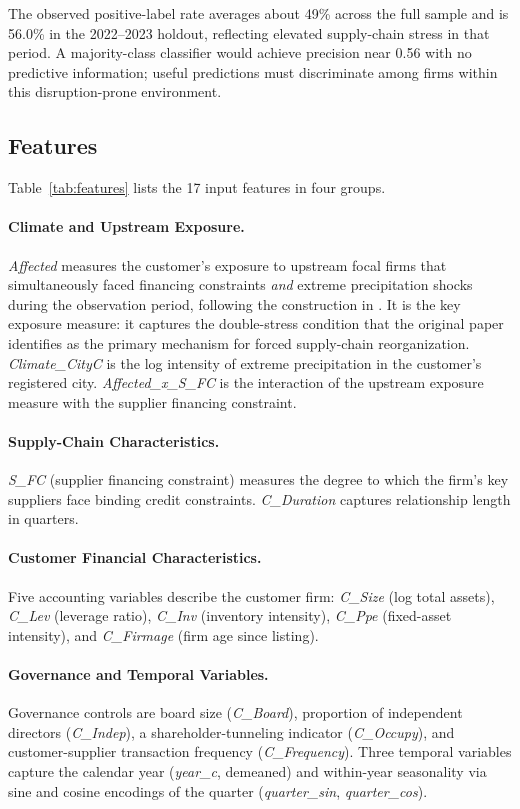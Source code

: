 \documentclass[12pt]{article}
\begin{document}
The observed positive-label rate averages about 49\% across the full
sample and is 56.0\% in the 2022--2023 holdout, reflecting elevated
supply-chain stress in that period.  A majority-class classifier would
achieve precision near 0.56 with no predictive information; useful
predictions must discriminate among firms within this disruption-prone
environment.

\subsection{Features}

Table~\ref{tab:features} lists the 17 input features in four groups.

\paragraph{Climate and Upstream Exposure.}
\emph{Affected} measures the customer's exposure to upstream focal firms
that simultaneously faced financing constraints \emph{and} extreme
precipitation shocks during the observation period, following the
construction in \citet{original2024climate}.  It is the key exposure
measure: it captures the double-stress condition that the original paper
identifies as the primary mechanism for forced supply-chain reorganization.
\emph{Climate\_CityC} is the log intensity of extreme precipitation in the
customer's registered city.  \emph{Affected\_x\_S\_FC} is the interaction
of the upstream exposure measure with the supplier financing constraint.

\paragraph{Supply-Chain Characteristics.}
\emph{S\_FC} (supplier financing constraint) measures the degree to which
the firm's key suppliers face binding credit constraints.
\emph{C\_Duration} captures relationship length in quarters.

\paragraph{Customer Financial Characteristics.}
Five accounting variables describe the customer firm: \emph{C\_Size} (log
total assets), \emph{C\_Lev} (leverage ratio), \emph{C\_Inv} (inventory
intensity), \emph{C\_Ppe} (fixed-asset intensity), and \emph{C\_Firmage}
(firm age since listing).

\paragraph{Governance and Temporal Variables.}
Governance controls are board size (\emph{C\_Board}), proportion of
independent directors (\emph{C\_Indep}), a shareholder-tunneling
indicator (\emph{C\_Occupy}), and customer-supplier transaction
frequency (\emph{C\_Frequency}).  Three temporal variables capture the
calendar year (\emph{year\_c}, demeaned) and within-year seasonality via
sine and cosine encodings of the quarter (\emph{quarter\_sin},
\emph{quarter\_cos}).
\end{document}
